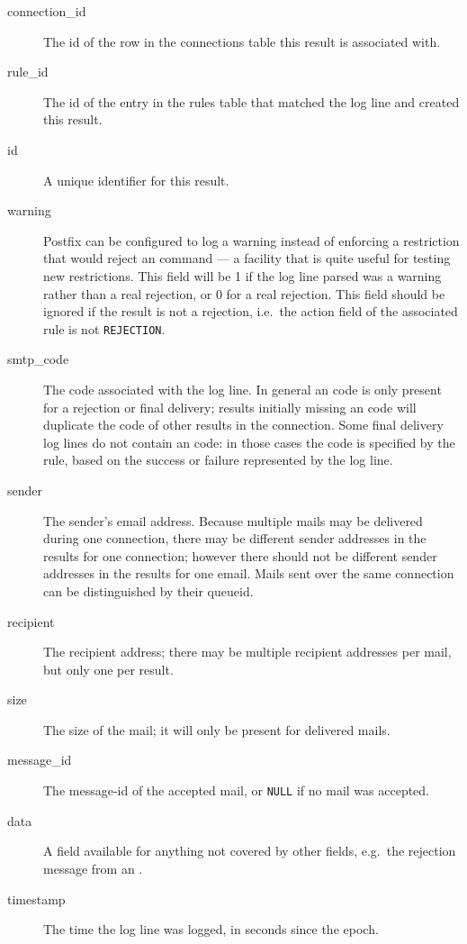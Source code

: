 \begin{description}

    \item [connection\_id] The id of the row in the connections table this
        result is associated with.

    \item [rule\_id] The id of the entry in the rules table that matched
        the log line and created this result.

    \item [id] A unique identifier for this result.

    \item [warning] Postfix can be configured to log a warning instead of
        enforcing a restriction that would reject an \SMTP{} command --- a
        facility that is quite useful for testing new restrictions.  This
        field will be 1 if the log line parsed was a warning rather than a
        real rejection, or 0 for a real rejection.  This field should be
        ignored if the result is not a rejection, i.e.\ the action field of
        the associated rule is not \texttt{REJECTION}.

    \item [smtp\_code] The \SMTP{} code associated with the log line.  In
        general an \SMTP{} code is only present for a rejection or final
        delivery; results initially missing an \SMTP{} code will duplicate
        the \SMTP{} code of other results in the connection.  Some final
        delivery log lines do not contain an \SMTP{} code: in those cases
        the code is specified by the rule, based on the success or failure
        represented by the log line.

    \item [sender] The sender's email address.  Because multiple mails may
        be delivered during one connection, there may be different sender
        addresses in the results for one connection; however there should
        not be different sender addresses in the results for one email.
        Mails sent over the same connection can be distinguished by their
        queueid.

    \item [recipient] The recipient address; there may be multiple
        recipient addresses per mail, but only one per result.

    \item [size] The size of the mail; it will only be present for
        delivered mails.

    \item [message\_id] The message-id of the accepted mail, or
        \texttt{NULL} if no mail was accepted.

    \item [data] A field available for anything not covered by other
        fields, e.g.\ the rejection message from an \DNSBL{}\@.

    \item [timestamp] The time the log line was logged, in seconds since
        the epoch.

\end{description}

